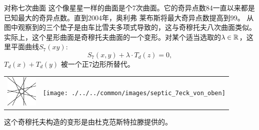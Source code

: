 ﻿\begin{surferPage}[七次曲面]{对称七次曲面}
这个像星星一样的曲面是个7次曲面。它的奇异点数84一直以来都是已知最大的奇异点数。直到2004年，奥利弗 莱布斯将最大奇异点数提高到99。
从图中观察到的三个垫子是由车比雪夫多项式导致的，这与奇穆托夫八次曲面类似。实际上，这个星形曲面是奇穆托夫曲面的一个变形。对某个适当选取的$\lambda\in{\mathbb R}$，这里平面曲线$S_7(xy)$: \[S_7(x,y) + \lambda \cdot T_d(z) = 0,\] $T_d(x)+T_d(y)$ 被一个正7边形所替代。
\vspace*{-0.3em}
    \begin{center}
      \begin{tabular}{c@{\qquad}c}
        \includegraphics[height=1.5cm]{./../../common/images/labsseptic1.pdf}
        &
        \texttt{[image: ./../../common/images/septic\_7eck\_von\_oben]}
      \end{tabular}
    \end{center}
    \vspace*{-0.3em}
这个奇穆托夫构造的变形是由杜克范斯特拉滕提供的。
\end{surferPage}

